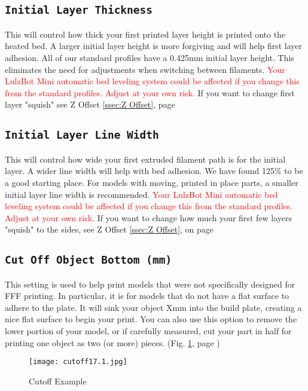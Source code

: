 \subsection{\texttt{Initial Layer Thickness}}
This will control how thick your first printed layer height is printed onto the heated bed. A larger initial layer height is more forgiving and will help first layer adhesion. All of our standard profiles have a 0.425mm initial layer height. This eliminates the need for adjustments when switching between filaments.  \textcolor{red}{Your LulzBot Mini automatic bed leveling system could be affected if you change this from the standard profiles. Adjust at your own risk.} If you want to change first layer "squish" see Z Offset \ref{ssec:Z Offset}, page \pageref{ssec:Z Offset} 

\subsection{\texttt{Initial Layer Line Width}}
This will control how wide your first extruded filament path is for the initial layer. A wider line width will help with bed adhesion. We have found 125\% to be a good starting place. For models with moving, printed in place parts, a smaller initial layer line width is recommended. \textcolor{red}{Your LulzBot Mini automatic bed leveling system could be affected if you change this from the standard profiles. Adjust at your own risk.} If you want to change how much your first few layers "squish" to the sides, see Z Offset \ref{ssec:Z Offset}, on page \pageref{ssec:Z Offset} 


\subsection{\texttt{Cut Off Object Bottom (mm)}}
This setting is used to help print models that were not specifically designed for FFF printing. In particular, it is for models that do not have a flat surface to adhere to the plate. It will sink your object Xmm into the build plate, creating a nice flat surface to begin your print. You can also use this option to remove the lower portion of your model, or if carefully measured, cut your part in half for printing one object as two (or more) pieces. (Fig. \ref{fig:Cutoff Example}, page \pageref{fig:Cutoff Example})
\begin{figure}[H]
\centering
\texttt{[image: cutoff17.1.jpg]}
\caption{Cutoff Example}
\label{fig:Cutoff Example}
\end{figure}

